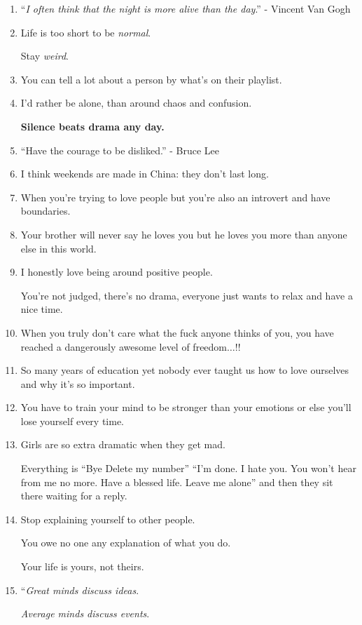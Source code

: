 \documentclass{article}
\numberwithin{equation}{section}
\begin{document}
\begin{enumerate}
    Stay away from assholes.
    \item ``\textit{I often think that the night is more alive than the day}.'' - Vincent Van Gogh
    \item Life is too short to be \textit{normal}.
    
    Stay \textit{weird}.
    \item You can tell a lot about a person by what's on their playlist.
    \item I'd rather be alone, than around chaos and confusion.
    
    \textbf{Silence beats drama any day.}
    \item ``Have the courage to be disliked.'' - Bruce Lee
    \item I think weekends are made in China: they don't last long.
    \item When you're trying to love people but you're also an introvert and have boundaries.
    \item Your brother will never say he loves you but he loves you more than anyone else in this world.
    \item I honestly love being around positive people.
    
    You're not judged, there's no drama, everyone just wants to relax and have a nice time.
    \item When you truly don't care what the fuck anyone thinks of you, you have reached a dangerously awesome level of freedom$\ldots$!!
    \item So many years of education yet nobody ever taught us how to love ourselves and why it's so important.
    \item You have to train your mind to be stronger than your emotions or else you'll lose yourself every time.
    \item Girls are so extra dramatic when they get mad.
    
    Everything is ``Bye Delete my number'' ``I'm done. I hate you. You won't hear from me no more. Have a blessed life. Leave me alone'' and then they sit there waiting for a reply.
    \item Stop explaining yourself to other people.
    
    You owe no one any explanation of what you do.
    
    Your life is yours, not theirs.
    \item ``\textit{Great minds discuss ideas}.
    
    \textit{Average minds discuss events}.
    

\end{enumerate}
\end{document}

